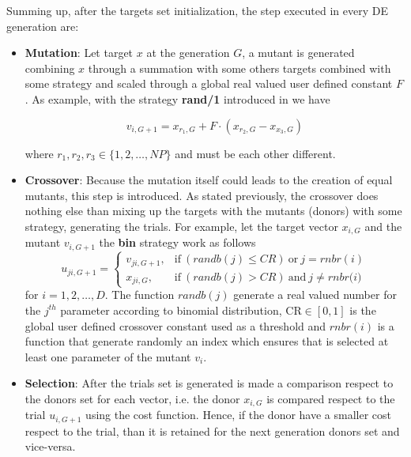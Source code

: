 Summing up, after the targets set initialization, the step executed in every DE generation are:
\begin{itemize}
	\item{\textbf{Mutation}: Let target $x$ at the generation $G$, a mutant is generated combining $x$ through a summation with some others targets combined with some strategy and scaled through a global real valued user defined constant $F$. As example, with the strategy \textbf{rand/1} introduced in \cite{DESEHGOCS:1997} we have
	\begin{center}
		\begin{equation}
			v_{i,G+1} = x_{r_{1},G} + F\cdot(x_{r_{2},G} - x_{x_{3},G})
		\end{equation}
	\end{center}
	where $r_{1},r_{2},r_{3} \in \{1,2,\dots,NP\}$ and must be each other different.}
	\item{\textbf{Crossover}: Because the mutation itself could leads to the creation of equal mutants, this step is introduced. As stated previously, the crossover does nothing else than mixing up the targets with the mutants (donors) with some strategy, generating the trials. For example, let the target vector $x_{i,G}$ and the mutant $v_{i,G+1}$ the \textbf{bin} strategy work as follows
	\begin{equation}
		u_{ji, G+1} = \begin{cases}
			v_{ji,G+1}, & \textrm{if}\ (\textit{randb}(j) \leq \textit{CR})\ \textrm{or}\ j=\textit{rnbr}(i)\\
			x_{ji,G}, & \textrm{if}\ (\textit{randb}(j) > \textit{CR})\ \textrm{and}\ j\neq\textit{rnbr(i)}
		\end{cases}
	\end{equation}
	for $i=1,2,\dots,D$. The function $\textit{randb}(j)$ generate a real valued number for the $j^{th}$ parameter according to binomial distribution, $\textrm{CR}\in[0,1]$ is the global user defined crossover constant used as a threshold and $\textit{rnbr}(i)$ is a function that generate randomly an index which ensures that is selected at least one parameter of the mutant $v_{i}$.}
	\item{\textbf{Selection}: After the trials set is generated is made a comparison respect to the donors set for each vector, i.e. the donor $x_{i, G}$ is compared respect to the trial $u_{i,G+1}$ using the cost function. Hence, if the donor have a smaller cost respect to the trial, than it is retained for the next generation donors set and vice-versa.}
\end{itemize}


